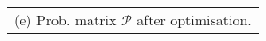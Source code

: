 \scriptsize
\begin{tabular}[t]{l}
	(e) Prob. matrix {$\mathcal{P}$} after optimisation.
\end{tabular}